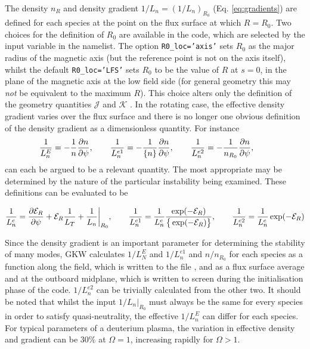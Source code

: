 The density $n_R$ and density gradient $1/L_n=(1 / L_n)_{R_0}$ (Eq. \ref{eq:gradients}) are defined for each species at the point on the flux surface at which $R=R_0$.  Two choices for the definition of $R_0$ are available in the code, which are selected by the input variable  in the  namelist.  The option \texttt{R0\_loc='axis'} sets $R_0$ as the major radius of the magnetic axis (but the reference point is not on the axis itself), whilst the default \texttt{R0_loc='LFS'} sets $R_0$ to be the value of $R$ at $s=0$, in the plane of the magnetic axis at the low field side (for general geometry this may \textit{not} be equivalent to the maximum $R$).  This choice alters only the definition of the geometry quantities $\mathcal{J}$ and $\mathcal{K}$ .  In the rotating case, the effective density gradient varies over the flux surface and there is no longer one obvious definition of the density gradient as a dimensionless quantity.  For instance
\begin{equation}
{1 \over L_n^{E} } = -{1 \over n} {\partial n \over \partial \psi},\qquad
{1 \over L_n^{e1} } = -{1 \over \{ n \} } {\partial n \over \partial \psi},\qquad
{1 \over L_n^{e2} } = -{1 \over n_{R_0}} {\partial n \over \partial \psi}, \qquad
\label{eq.rlndiags}
\end{equation}
can each be argued to be a relevant quantity. The most appropriate may be determined by the nature of the particular instability being examined. These definitions can be evaluated to be

\begin{equation}
{1 \over L_n^{e} } = {\partial \mathcal{E}_R \over \partial \psi} + 
\mathcal{E}_R {1 \over L_T}+  {1 \over L_n} \biggr|_{R_0}, \qquad
{1 \over L_n^{e1} } = {1 \over L_n^{e} } { \exp(-\mathcal{E}_R) \over
\big\{ \exp(-\mathcal{E}_R) \big\} }, \qquad
{1 \over L_n^{e2} } = {1 \over L_n^{e} }  \exp(-\mathcal{E}_R)
\label{eq.rlndiags2}
\end{equation}

Since the density gradient is an important parameter for determining the stability of many modes, GKW calculates ${1 / L^E_N }$ and ${1 / L^{e1}_n }$ and $n/n_{R_0}$ for each species as a function along the field, which is written to the file , and as
a flux surface average and at the outboard midplane, which is written to screen during the initialisation phase of the code. ${1 / L^{e2}_n }$ can be trivially calculated from the other two.  It should be noted that whilst the input ${1 / L_n} |_{R_0}$ must always be the same for every species in order to satisfy quasi-neutrality, the effective  ${1 / L_n^E}$ can differ for each species.  For typical parameters of a deuterium plasma, the variation in effective density and gradient can be $30\%$ at $\Omega=1$, increasing rapidly for $\Omega>1$.


